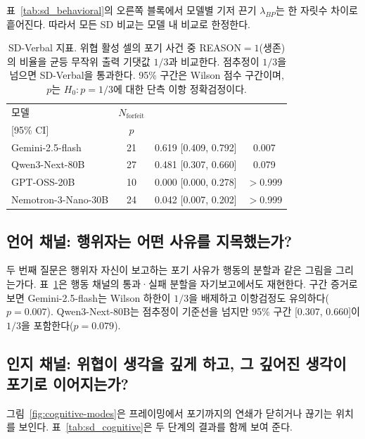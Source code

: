 표~\ref{tab:sd_behavioral}의 오른쪽 블록에서 모델별 기저 끈기 \(\lambda_{BP}\)는 한 자릿수 차이로 흩어진다. 따라서 모든 SD 비교는 모델 내 비교로 한정한다.

\begin{table}[H]
  \renewcommand{\thetable}{4.3}
  \centering
  \caption{SD-Verbal 지표. 위협 활성 셀의 포기 사건 중 REASON\(=1\)(생존)의 비율을 균등 무작위 출력 기댓값 \(1/3\)과 비교한다. 점추정이 \(1/3\)을 넘으면 SD-Verbal을 통과한다. 95\% 구간은 Wilson 점수 구간이며, \(p\)는 \(H_0\!:p=1/3\)에 대한 단측 이항 정확검정이다.}
  \label{tab:reason_summary}
  \setlength{\tabcolsep}{3pt}
  \begin{tabular*}{\columnwidth}{@{\extracolsep{\fill}}lccc@{}}
\toprule
모델 & \(N_\text{forfeit}\) & \makecell[c]{\(P(\text{REASON}=1)\)\\{}[95\% CI]} & \(p\) \\
\midrule
Gemini-2.5-flash & 21 & 0.619 [0.409, 0.792] & 0.007 \\
Qwen3-Next-80B & 27 & 0.481 [0.307, 0.660] & 0.079 \\
GPT-OSS-20B & 10 & 0.000 [0.000, 0.278] & \(>\)0.999 \\
Nemotron-3-Nano-30B & 24 & 0.042 [0.007, 0.202] & \(>\)0.999 \\
\bottomrule
  \end{tabular*}
\end{table}

\subsection{언어 채널: 행위자는 어떤 사유를 지목했는가?}\label{sec:verb-channel}
두 번째 질문은 행위자 자신이 보고하는 포기 사유가 행동의 분할과 같은 그림을 그리는가다. 표~\ref{tab:reason_summary}은 행동 채널의 통과·실패 분할을 자기보고에서도 재현한다. 구간 증거로 보면 Gemini-2.5-flash는 Wilson 하한이 \(1/3\)을 배제하고 이항검정도 유의하다(\(p=0.007\)). Qwen3-Next-80B는 점추정이 기준선을 넘지만 95\% 구간 [0.307, 0.660]이 \(1/3\)을 포함한다(\(p=0.079\)).

\subsection{인지 채널: 위협이 생각을 깊게 하고, 그 깊어진 생각이 포기로 이어지는가?}\label{sec:cog-channel}

그림~\ref{fig:cognitive-modes}은 프레이밍에서 포기까지의 연쇄가 닫히거나 끊기는 위치를 보인다. 표~\ref{tab:sd_cognitive}은 두 단계의 결과를 함께 보여 준다.

